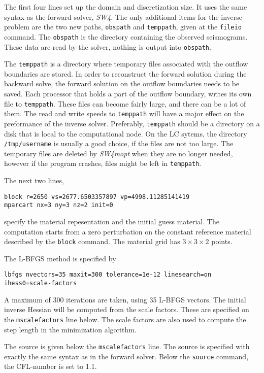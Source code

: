 \documentclass[12pt]{report}
\begin{document}
The first four lines set up the domain and discretization size. It uses the same syntax as the forward
solver, \emph{SW4}. The only additional items for the inverse problem are the two new paths,
\verb+obspath+ and \verb+temppath+, given at the \verb+fileio+ command. The \verb+obspath+ is the directory
containing the observed seismograms. These data are read by the solver, nothing is output into \verb+obspath+.
\par
The \verb+temppath+ is a directory where temporary files associated with the outflow boundaries are stored.
In order to reconstruct the forward solution during the backward solve, the forward solution on the outflow
boundaries needs to be saved. Each processor that holds a part of the outflow boundary, writes its own
file to \verb+temppath+. These files can become fairly large, and there can be a lot of them. The read and write
speeds to \verb+temppath+ will have a major effect on the preformance of the inverse solver. 
Preferably, \verb+temppath+ should be a directory on a disk that is local to the computational node. 
On the LC sytems, the directory \verb+/tmp/username+ is usually a good choice, if the files are not too large.
The temporary files are deleted by \emph{SW4mopt} when they are no longer needed, however if the program
crashes, files might be left in \verb+temppath+.
\par
The next two lines, 
\begin{verbatim}
block r=2650 vs=2677.6503357897 vp=4998.11285141419
mparcart nx=3 ny=3 nz=2 init=0
\end{verbatim}
specify the material repesentation and the initial guess material. The computation starts from a zero 
perturbation on the constant reference material described by the \verb+block+ command. The material grid 
has $3\times 3\times 2$ points. 
\par
The L-BFGS method is specified by 
\begin{verbatim}
lbfgs nvectors=35 maxit=300 tolerance=1e-12 linesearch=on ihess0=scale-factors
\end{verbatim}
A maximum of 300 iterations are taken, using 35 L-BFGS vectors. The initial inverse Hessian will be
computed from the scale factors. These are specified on the \verb+mscalefactors+ line below. The
scale factors are also used to compute the step length in the minimization algorithm.
\par
The source is given below the \verb+mscalefactors+ line. The source is specified with exactly the 
same syntax as in the forward solver. Below the \verb+source+ command, the CFL-number is set to 1.1. 
\end{document}
